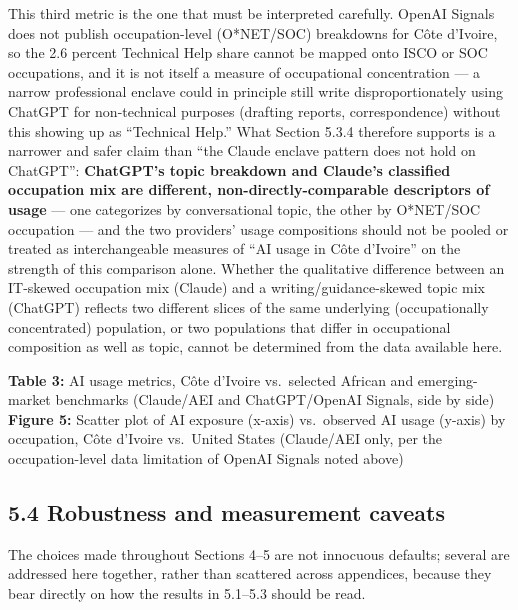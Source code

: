 \documentclass[
  11pt,
]{article}
\begin{document}
This third metric is the one that must be interpreted carefully. OpenAI
Signals does not publish occupation-level (O*NET/SOC) breakdowns for
Côte d'Ivoire, so the 2.6 percent Technical Help share cannot be mapped
onto ISCO or SOC occupations, and it is not itself a measure of
occupational concentration --- a narrow professional enclave could in
principle still write disproportionately using ChatGPT for non-technical
purposes (drafting reports, correspondence) without this showing up as
``Technical Help.'' What Section 5.3.4 therefore supports is a narrower
and safer claim than ``the Claude enclave pattern does not hold on
ChatGPT'': \textbf{ChatGPT's topic breakdown and Claude's classified
occupation mix are different, non-directly-comparable descriptors of
usage} --- one categorizes by conversational topic, the other by
O*NET/SOC occupation --- and the two providers' usage compositions
should not be pooled or treated as interchangeable measures of ``AI
usage in Côte d'Ivoire'' on the strength of this comparison alone.
Whether the qualitative difference between an IT-skewed occupation mix
(Claude) and a writing/guidance-skewed topic mix (ChatGPT) reflects two
different slices of the same underlying (occupationally concentrated)
population, or two populations that differ in occupational composition
as well as topic, cannot be determined from the data available here.

\textbf{Table 3:} AI usage metrics, Côte d'Ivoire vs.~selected African
and emerging-market benchmarks (Claude/AEI and ChatGPT/OpenAI Signals,
side by side) \textbf{Figure 5:} Scatter plot of AI exposure (x-axis)
vs.~observed AI usage (y-axis) by occupation, Côte d'Ivoire vs.~United
States (Claude/AEI only, per the occupation-level data limitation of
OpenAI Signals noted above)

\subsection{5.4 Robustness and measurement
caveats}\label{robustness-and-measurement-caveats}

The choices made throughout Sections 4--5 are not innocuous defaults;
several are addressed here together, rather than scattered across
appendices, because they bear directly on how the results in 5.1--5.3
should be read.
\end{document}
